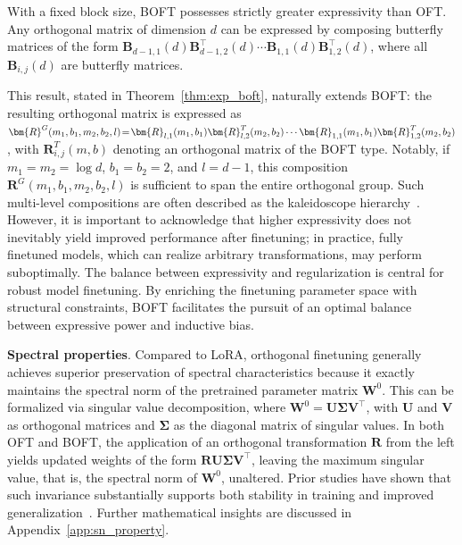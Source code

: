 \begin{theorem}\label{thm:exp_boft}
    With a fixed block size, BOFT possesses strictly greater expressivity than OFT. Any orthogonal matrix of dimension $d$ can be expressed by composing butterfly matrices of the form $\bm{B}_{d-1,1}(d)\bm{B}^\top_{d-1,2}(d)\cdots\bm{B}_{1,1}(d)\bm{B}^\top_{1,2}(d)$, where all $\bm{B}_{i,j}(d)$ are butterfly matrices.
\end{theorem}

This result, stated in Theorem~\ref{thm:exp_boft}, naturally extends BOFT: the resulting orthogonal matrix is expressed as $\thickmuskip=2mu \medmuskip=2mu \bm{R}^G(m_1,b_1,m_2,b_2,l)=\bm{R}_{l,1}(m_1,b_1)\bm{R}_{l,2}^T(m_2,b_2)\cdots\bm{R}_{1,1}(m_1,b_1)\bm{R}_{1,2}^T(m_2,b_2)$, with $\bm{R}_{i,j}^T(m,b)$ denoting an orthogonal matrix of the BOFT type. Notably, if $m_1=m_2=\log d$, $b_1=b_2=2$, and $l=d-1$, this composition $\bm{R}^G(m_1,b_1,m_2,b_2,l)$ is sufficient to span the entire orthogonal group. Such multi-level compositions are often described as the kaleidoscope hierarchy~\cite{dao2019kaleidoscope}. However, it is important to acknowledge that higher expressivity does not inevitably yield improved performance after finetuning; in practice, fully finetuned models, which can realize arbitrary transformations, may perform suboptimally. The balance between expressivity and regularization is central for robust model finetuning. By enriching the finetuning parameter space with structural constraints, BOFT facilitates the pursuit of an optimal balance between expressive power and inductive bias.

\textbf{Spectral properties}. Compared to LoRA, orthogonal finetuning generally achieves superior preservation of spectral characteristics because it exactly maintains the spectral norm of the pretrained parameter matrix $\bm{W}^0$. This can be formalized via singular value decomposition, where $\bm{W}^0=\bm{U}\bm{\Sigma}\bm{V}^\top$, with $\bm{U}$ and $\bm{V}$ as orthogonal matrices and $\bm{\Sigma}$ as the diagonal matrix of singular values. In both OFT and BOFT, the application of an orthogonal transformation $\bm{R}$ from the left yields updated weights of the form $\bm{R}\bm{U}\bm{\Sigma}\bm{V}^\top$, leaving the maximum singular value, that is, the spectral norm of $\bm{W}^0$, unaltered. Prior studies have shown that such invariance substantially supports both stability in training and improved generalization~\cite{miyato2018spectral,yoshida2017spectral}. Further mathematical insights are discussed in Appendix~\ref{app:sn_property}.

